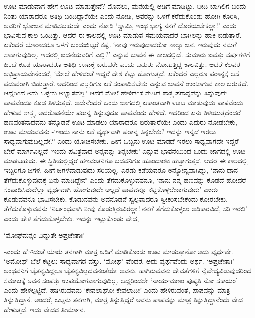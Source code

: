 ಊಟ ಮಾಡುವಾಗ ಹೇಗೆ ಊಟ ಮಾಡುತ್ತೇವೆ? ಮೊದಲು, ಮನೆಯಲ್ಲಿ ಅಡಿಗೆ ಮಾಡಿಟ್ಟು, ಬೀದಿ ಬಾಗಿಲಿಗೆ ಬಂದು ನಿಂತು ಯಾರಾದರೂ ಅತಿಥಿ ಬಂದಿದ್ದಾರೆಯೇ ಎಂದು ನೋಡಿ, ಅವರನ್ನು ಒಳಗೆ ಕರೆದುಕೊಂಡು ಹೋಗಿ ಕೂರಿಸಿ, ಅವರಿಗೆ ಭೋಜನ ಮಾಡಿಸಬಹುದೇ ಎಂದು ನೋಡಿ `ಸ್ವಾಮಿ, ಇಂಥ ಭಾಗ್ಯ ನನಗೆ ದೊರೆಯಬೇಕಲ್ಲಾ!' ಎಂದು ಭಾವಿಸುವ ಕಾಲ ಒಂದಿತ್ತು. ಆದರೆ ಈ ಕಾಲದಲ್ಲಿ ಊಟ ಮಾಡುವ ಸಮಯವಾದರೆ ಬಾಗಿಲನ್ನು ಹಾಕಿ ಬಿಡುತ್ತಾರೆ. ಏಕೆಂದರೆ ಯಾರಾದರೂ ಒಳಗೆ ಬಂದುಬಿಟ್ಟರೆ ಕಷ್ಟ. `ನಾವು ಇರುವುದಾದರೋ ನಾಲ್ಕು ಜನ. ಇರುವುದು ನಮಗೆ ಸಾಕಾಗುವುದಿಲ್ಲ. ಇದರಲ್ಲಿ ಐದನೆಯವರಿಗೆ ಎಲ್ಲಿ?' ಎನ್ನುವ ಭಾವನೆ ಈ ಕಾಲದಲ್ಲಿದೆ. ಸುಮಾರು ಐವತ್ತು ವರ್ಷಗಳಿಗೆ ಹಿಂದೆ ಕೂಡ ಯಾರಾದರೂ ಅತಿಥಿ ಊಟಕ್ಕೆ ಬರುವರೇ ಎಂದು ಎದುರು ನೋಡುತ್ತಿದ್ದ ಕಾಲವಿತ್ತು. ಆದರೆ ಕೆಲವರ ಅಭಿಪ್ರಾಯವೇನೆಂದರೆ, `ಮೇಲೆ ಹೇಳಿದಂತೆ ಇದ್ದರೆ ದೇಶ ಕೆಟ್ಟು ಹೋಗುತ್ತದೆ. ಏಕೆಂದರೆ ಎಲ್ಲರೂ ಪರಾನ್ನಕ್ಕೆ ಆಸೆ ಪಡುವರಾಗಿ ಬಿಡುತ್ತಾರೆ. ಅದರಿಂದ ಎಲ್ಲರಿಗೂ ಏಕೆ ಸಂಪಾದಿಸಬೇಕು ಎನ್ನುವ ಭಾವನೆ ಉಂಟಾಗುವ ಕಾಲ ಬರುತ್ತದೆ. ಆದ್ದರಿಂದ ಅದು ಒಳ್ಳೆಯ ಅಭ್ಯಾಸವಲ್ಲ.' ಆದರೆ ಮೇಲೆ ಹೇಳಿದಂತೆ ನುಡಿದ ಶಾಸ್ತ್ರ ಪರಾನ್ನವನ್ನು ತಿನ್ನುವುದು ಪಾಪವೆಂದೂ ಕೂಡ ತಿಳಿಸುತ್ತದೆ. ಅದೇನೆಂದರೆ ಒಂದು ಜಾಗದಲ್ಲಿ ಏಕಾಂತವಾಗಿ ಊಟ ಮಾಡುವುದು ಪಾಪವೆಂದು ಹೇಳುವ ಶಾಸ್ತ್ರ, ಅದರೊಡನೆಯೇ ಪರಾನ್ನ ತಿನ್ನುವುದೂ ಪಾಪವೆಂದು ಹೇಳಿದೆ. ಇದರಿಂದ ಏನು ತಿಳಿಯುತ್ತದೆಂದರೆ ಹಣವಂತನಾದವನು ತನ್ನೊಡನೆ ಊಟ ಮಾಡಲು ಯಾರಾದರೂ ಬರುತ್ತಾರೆಯೇ ಎಂದು ಎದುರು ನೋಡಬೇಕು, ಊಟ ಮಾಡುವವನು -`ಇಂದು ನಾನು ಏಕೆ ವ್ಯರ್ಥವಾಗಿ ಪರಾನ್ನ ತಿನ್ನಬೇಕು? ಇದನ್ನು ಇನ್ನದೆ ಇರಲು ಸಾಧ್ಯವಾಗುವುದಿಲ್ಲವೇ?' ಎಂದು ಯೋಚಿಸಬೇಕು. ಹೀಗೆ ಒಬ್ಬನು ಊಟ ಮಾಡದೆ ಇರಲು ಸಾಧ್ಯವಾಗದೇ ಇದ್ದರೆ ಬೇರೆ ಮಾರ್ಗವಿಲ್ಲದೆ `ಇಂದು ಪವಿತ್ರವಾದ ಅನ್ನವನ್ನು ತಿನ್ನಬೇಕು' ಎನ್ನುವ ಭಾವನೆಯಿಂದ ಒಂದು ಜಾಗದಲ್ಲಿ ಊಟ ಮಾಡಬಹುದು. ಈ ಸ್ಥಿತಿಯಲ್ಲಿದ್ದರೆ ಹಣವಂತನಿಗೂ ಬಡವನಿಗೂ ಹೊಂದಾಣಿಕೆ ಹೆಚ್ಚಾಗುತ್ತದೆ. ಆದರೆ ಈ ಕಾಲದಲ್ಲಿ ಇಬ್ಬರಿಗೂ ಜಗಳ. ಹೀಗೆ ಜಗಳವಾಡುವುದು ಸರಿಯಲ್ಲ. ಎರಡು ಕಡೆಯವರೂ ಅನ್ಯೋನ್ಯವಾಗಿದ್ದು, `ನಾನು ದಾನ ತೆಗೆದುಕೊಳ್ಳುವುದಕ್ಕೆ ಏನು ಮಾಡಿದ್ದೇನೆ' ಎಂದು ತೆಗೆದುಕೊಳ್ಳುವವನೂ, `ನಾನು ನನ್ನ ಹಣವನ್ನು ಕೊಡದೆ ಹೋದರೆ ಸಂಪಾದಿಸಿದುದೆಲ್ಲಾ ವ್ಯರ್ಥವಾಗಿ ಹೋಗುವುದೇ ಅಲ್ಲದೆ ಪಾಪವನ್ನೂ ಕಟ್ಟಿಕೊಳ್ಳಬೇಕಾಗುವುದು' ಎಂದು ಕೊಡುವವನೂ ಭಾವಿಸಬೇಕು. ಕೊಡುವವನು ಅವನೊಡನೆ ಸ್ವಲ್ಪವಾದರೂ ಸ್ವೀಕರಿಸಬೇಕೆಂದು ಕೋರಬೇಕು. ತೆಗೆದುಕೊಳ್ಳುವವನು `ನಿರ್ಬಂಧವಾಗಿ ನೀವು ಕೊಡುತ್ತಿರುವಿರಲ್ಲಾ! ನನಗೆ ತೆಗೆದುಕೊಳ್ಳಲು ಅಧಿಕಾರವಿದೆ, ಸರಿ ಇರಲಿ' ಎಂದು ಹೇಳಿ ತೆಗೆದುಕೊಳ್ಳಬೇಕು. ಇದನ್ನು ಇಟ್ಟುಕೊಂಡು ವೇದ,

\begin{shloka}
`ಮೋಘಮನ್ನಂ ವಿದ್ದುತೇ ಅಪ್ರಚೇತಾಃ'
\end{shloka}

-ಎಂದು ಹೇಳಿದಂತೆ ಯಾರು ತನಗಾಗಿ ಮಾತ್ರ ಅಡಿಗೆ ಮಾಡಿಕೊಂಡು ಊಟ ಮಾಡುತ್ತಾನೋ ಅದು ವ್ಯರ್ಥವೇ. `ಅಮೋಘ' ಬೆಲೆ ಕಟ್ಟಲು ಸಾಧ್ಯವಾಗದ ವಸ್ತು. `ಮೋಘ' ವೆಂದರೆ, ಅದು ವ್ಯರ್ಥವೆಂದು ಅರ್ಥ. `ಅಪ್ರಚೇತಾಃ' ಅಂಥವನಿಗೆ ಚೈತನ್ಯವಿದ್ದರೂ ಚೈತನ್ಯವಿಲ್ಲದವನಂತೆಯೇ ಅವನು. ಹಾಗಿರುವವನು ದೇವತೆಗಳಿಗೆ ನೈವೇದ್ಯವಿಡುವುದರಿಂದ ಸಮಾಜಕ್ಕೆ ಅವನ ಸಂಪತ್ತು ಉಪಯೋಗವಾಗುವುದಿಲ್ಲ. ಆದ್ದರಿಂದಲೇ `ನಾರ್ಯಮಣಂ ಪುಷ್ಯತಿ ನೋ ಸಕಾಯಂ' ಎಂದು ಹೇಳಲ್ಪಟ್ಟಿದೆ. ಹಾಗಿರುವವನು `ಕೇವಲಾಘೋ ಕೇವಲಾದೀ' ಎಂದು ಹೇಳಿರುವಂತೆ, ಪಾಪವನ್ನು ಮಾತ್ರ ತಿನ್ನುತ್ತಿದ್ದಾನೆ. ಅಂದರೆ, ಒಬ್ಬನು ತನಗಾಗಿ, ಮಾತ್ರ ತಿನ್ನುತ್ತಿದ್ದರೆ ಅವನು ಪಾಪವನ್ನು ಮಾತ್ರ ತಿನ್ನುತ್ತಿದ್ದಾನೆಂದು ವೇದ ಹೇಳುತ್ತದೆ. ಇದು ವೇದದ ತೀರ್ಮಾನ.

